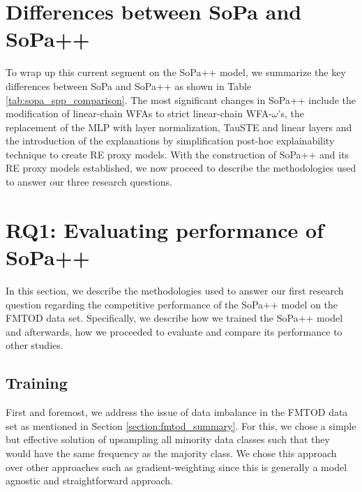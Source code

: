 \section{Differences between SoPa and SoPa++}

To wrap up this current segment on the SoPa++ model, we summarize the key
differences between SoPa and SoPa++ as shown in Table
\ref{tab:sopa_spp_comparison}. The most significant changes in SoPa++
include the modification of linear-chain WFAs to strict linear-chain
WFA-$\omega$'s, the replacement of the MLP with layer normalization, TauSTE and
linear layers and the introduction of the explanations by simplification
post-hoc explainability technique to create RE proxy models. With the
construction of SoPa++ and its RE proxy models established, we now proceed to
describe the methodologies used to answer our three research questions.

\section{RQ1: Evaluating performance of SoPa++}

In this section, we describe the methodologies used to answer our first research
question regarding the competitive performance of the SoPa++ model on the FMTOD
data set. Specifically, we describe how we trained the SoPa++ model and
afterwards, how we proceeded to evaluate and compare its performance to other
studies.

\subsection{Training}

\label{section:spp_training}

First and foremost, we address the issue of data imbalance in the FMTOD data set
as mentioned in Section \ref{section:fmtod_summary}. For this, we chose a simple
but effective solution of upsampling all minority data classes such that they
would have the same frequency as the majority class. We chose this approach over
other approaches such as gradient-weighting since this is generally a model
agnostic and straightforward approach.

